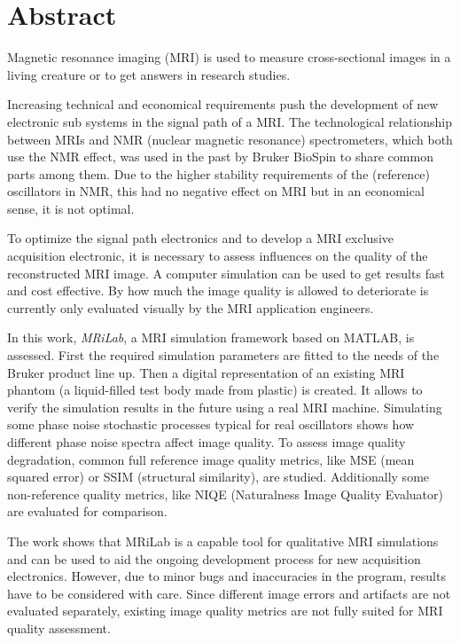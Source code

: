 \chapter*{Abstract}
\thispagestyle{empty}
Magnetic resonance imaging (MRI) is used to measure cross-sectional images in a living creature or to get answers in research studies.

Increasing technical and economical requirements push the development of new electronic sub systems in the signal path of a MRI. The technological relationship between MRIs and NMR (nuclear magnetic resonance) spectrometers, which both use the NMR effect, was used in the past by Bruker BioSpin to share common parts among them.
Due to the higher stability requirements of the (reference) oscillators in NMR, this had no negative effect on MRI but in an economical sense, it is not optimal.

To optimize the signal path electronics and to develop a MRI exclusive acquisition electronic, it is necessary to assess influences on the quality of the reconstructed MRI image. A computer simulation can be used to get results fast and cost effective. By how much the image quality is allowed to deteriorate is currently only evaluated visually by the MRI application engineers.

In this work, \textit{MRiLab}, a MRI simulation framework based on MATLAB, is assessed. First the required simulation parameters are fitted to the needs of the Bruker product line up. Then a digital representation of an existing MRI phantom (a liquid-filled test body made from plastic) is created. It allows to verify the simulation results in the future using a real MRI machine.
Simulating some phase noise stochastic processes typical for real oscillators shows how different phase noise spectra affect image quality. To assess image quality degradation, common full reference image quality metrics, like MSE (mean squared error) or SSIM (structural similarity), are studied. Additionally some non-reference quality metrics, like NIQE (Naturalness Image Quality Evaluator) are evaluated for comparison.

The work shows that MRiLab is a capable tool for qualitative MRI simulations and can be used to aid the ongoing development process for new acquisition electronics. However, due to minor bugs and inaccuracies in the program, results have to be considered with care. Since different image errors and artifacts are not evaluated separately, existing image quality metrics are not fully suited for MRI quality assessment.

